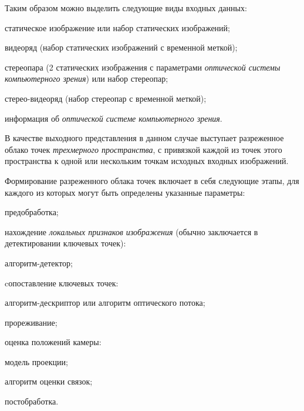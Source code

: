 Таким образом можно выделить следующие виды входных данных:
\begin{textitemize}
    \item статическое изображение или набор статических изображений;
    \item видеоряд (набор статических изображений с временной меткой);
    \item стереопара (2 статических изображения с параметрами \textit{оптической системы компьютерного зрения}) или набор стереопар;
    \item стерео-видеоряд (набор стереопар с временной меткой);
    \item информация об \textit{оптической системе компьютерного зрения}.
\end{textitemize}

В качестве выходного представления в данном случае выступает разреженное облако точек \textit{трехмерного пространства}, с привязкой каждой из точек этого пространства к одной или нескольким точкам исходных входных изображений.

Формирование разреженного облака точек включает в себя следующие этапы, для каждого из которых могут быть определены указанные параметры:
\begin{textitemize}
    \item предобработка;
    \item нахождение \textit{локальных признаков изображения} (обычно заключается в детектировании ключевых точек):
    \begin{textitemize}
        \item алгоритм-детектор;
    \end{textitemize}
    \item cопоставление ключевых точек:
    \begin{textitemize}
        \item алгоритм-дескриптор или алгоритм оптического потока;
        \item прореживание;
    \end{textitemize}
    \item оценка положений камеры:
    \begin{textitemize}
        \item модель проекции;
        \item алгоритм оценки связок;
    \end{textitemize}
    \item постобработка.
\end{textitemize}

